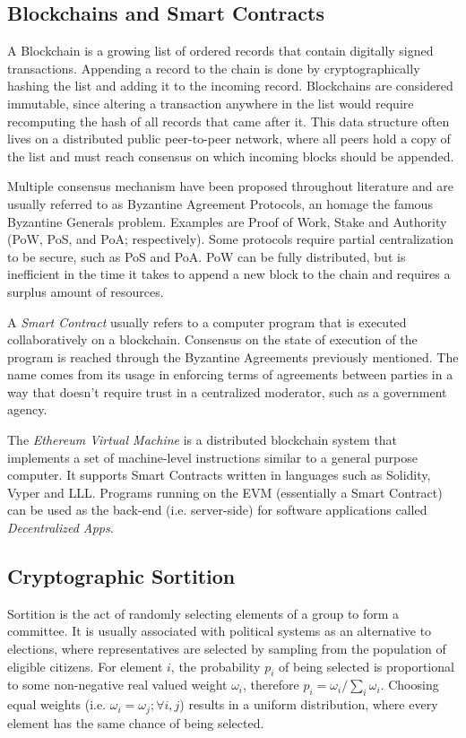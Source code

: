 \documentclass[conference]{IEEEtran}
\begin{document}
\subsection{Blockchains and Smart Contracts}
A Blockchain is a growing list of ordered records that contain digitally signed transactions. Appending a record to the chain is done by cryptographically hashing the list and adding it to the incoming record. Blockchains are considered immutable, since altering a transaction anywhere in the list would require recomputing the hash of all records that came after it. This data structure often lives on a distributed public peer-to-peer network, where all peers hold a copy of the list and must reach consensus on which incoming blocks should be appended. 

Multiple consensus mechanism have been proposed throughout literature and are usually referred to as Byzantine Agreement Protocols, an homage the famous Byzantine Generals problem. Examples are Proof of Work, Stake and Authority (PoW, PoS, and PoA; respectively). Some protocols require partial centralization to be secure, such as PoS and PoA. PoW can be fully distributed, but is inefficient in the time it takes to append a new block to the chain and requires a surplus amount of resources.

A \emph{Smart Contract} usually refers to a computer program that is executed collaboratively on a blockchain. Consensus on the state of execution of the program is reached through the Byzantine Agreements previously mentioned. The name comes from its usage in enforcing terms of agreements between parties in a way that doesn't require trust in a centralized moderator, such as a government agency.

The \emph{Ethereum Virtual Machine} is a distributed blockchain system that implements a set of machine-level instructions similar to a general purpose computer. It supports Smart Contracts written in languages such as Solidity, Vyper and LLL. Programs running on the EVM (essentially a Smart Contract) can be used as the back-end (i.e. server-side) for software applications called \emph{Decentralized Apps}.

\subsection{Cryptographic Sortition}
Sortition is the act of randomly selecting elements of a group to form a committee. It is usually associated with political systems as an alternative to elections, where representatives are selected by sampling from the population of eligible citizens. For element $i$, the probability $p_i$ of being selected is proportional to some non-negative real valued weight $\omega_i$, therefore $p_i = \omega_i/\sum_i\omega_i$. Choosing equal weights (i.e. $\omega_i = \omega_j; \forall i,j$) results in a uniform distribution, where every element has the same chance of being selected.
\end{document}
